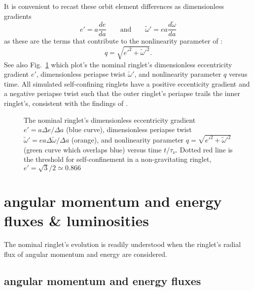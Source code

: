 \documentclass[preprint]{aastex62}
\begin{document}
It is convenient to recast these orbit element differences as dimensionless gradients
\begin{equation}
    \label{eqn:e_prime}
    e' = a\frac{de}{da}
    \qquad\mbox{and}\qquad
    \tilde{\omega}' = ea\frac{d\tilde{\omega}}{da}
\end{equation}
as these are the terms that contribute to the nonlinearity parameter of \cite{BGT83}:
\begin{equation}
    \label{eqn:q}
    q = \sqrt{e'^2 + \tilde{\omega}'^2}.
\end{equation}
See also Fig.\ \ref{fig:de_prime_nominal} which plot's the nominal
ringlet's dimensionless eccentricity gradient $e'$, dimensionless periapse twist $\tilde{\omega}'$,
and nonlinearity parameter $q$ versus time. All simulated self-confining ringlets
have a positive eccenticity gradient and a negative periapse twist such that
the outer ringlet's periapse trails the inner ringlet's, consistent with the findings of
\cite{BGT83}.\vfil

\begin{figure}
    \caption{
        \label{fig:de_prime_nominal}
        The nominal ringlet's dimensionless eccentricity gradient $e' = a\Delta e/\Delta a$
        (blue curve), dimensionless periapse twist $\tilde{\omega}' = ea\Delta\tilde{\omega}/\Delta a$
        (orange), and nonlinearity parameter $q=\sqrt{e'^2 + \tilde{\omega}'^2}$
        (green curve which overlaps blue) versus time $t/\tau_\nu$. Dotted red line 
        is the threshold for self-confinement in a non-gravitating ringlet, $e'=\sqrt{3}/2\simeq0.866$
    }
\end{figure}


\section{angular momentum and energy fluxes \& luminosities}
\label{sec:fluxes}

The nominal ringlet's evolution is readily understood when the ringlet's 
radial flux of angular momentum and energy are considered. 

\subsection{angular momentum and energy fluxes}
\label{subsec:fluxes}
\end{document}
